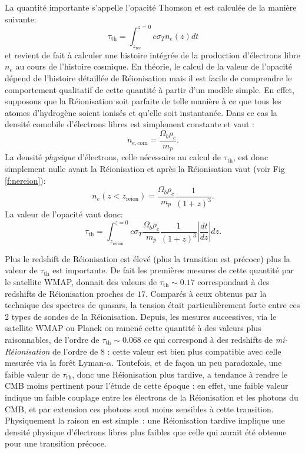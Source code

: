 La quantité importante s'appelle l'opacité Thomson et est calculée de la manière suivante:
\begin{equation}
\tau_\mathrm{th}=\int_{z_\mathrm{rec}}^{z=0} c \sigma_T n_e(z) dt
\end{equation}
et revient de fait à calculer une histoire intégrée de la production d'électrons libre $n_e$ au cours de l'histoire cosmique. En théorie, le calcul de la valeur de l'opacité dépend de l'histoire détaillée de Réionisation mais il est facile de comprendre le comportement qualitatif de cette quantité à partir d'un modèle simple. En effet, supposons que la Réionisation soit parfaite de telle manière à ce que tous les atomes d'hydrogène soient ionisés et qu'elle soit instantanée. Dans ce cas la densité comobile d'électrons libres est simplement constante et vaut :
\begin{equation}
n_\mathrm{e,com}=\frac{\Omega_b \rho_c}{m_p}.
\end{equation}
La densité \textit{physique} d'électrons, celle nécessaire au calcul de $\tau_\mathrm{th}$, est donc simplement nulle avant la Réionisation et après la Réionisation vaut (voir Fig \ref{f:nereion}):
\begin{equation}
n_e(z<z_\mathrm{reion})=\frac{\Omega_b \rho_c}{m_p} \frac{1}{(1+z)^3}.
\end{equation}
La valeur de l'opacité vaut donc:
\begin{equation}
\tau_\mathrm{th}=\int_{z_\mathrm{rerion}}^{z=0} c \sigma_T\frac{\Omega_b \rho_c}{m_p} \frac{1}{(1+z)^3}  |\frac{dt}{dz}| dz.
\end{equation}

Plus le redshift de Réionisation est élevé (plus la transition est précoce) plus la valeur de $\tau_\mathrm{th}$ est importante. De fait les premières mesures de cette quantité par le satellite WMAP, donnait des valeurs de $\tau_\mathrm{th}\sim 0.17$ correspondant à des redshifts de Réionisation proches de $17$. Comparés à ceux obtenus par la technique des spectres de quasars, la tension était particulièrement forte entre ces 2 types de sondes de la Réionisation. Depuis, les mesures successives, via le satellite WMAP ou Planck on ramené cette quantité à des valeurs plus raisonnables, de l'ordre de $\tau_\mathrm{th}\sim 0.068$ ce qui correspond à des redshifts de \textit{mi-Réionisation} de l'ordre de 8 : cette valeur est bien plus compatible avec celle mesurée via la forêt Lyman-$\alpha$. Toutefois, et de façon un peu paradoxale, une faible valeur de $\tau_\mathrm{th}$, donc une Réionisation plus tardive, a tendance à rendre le CMB moins pertinent pour l'étude de cette époque : en effet, une faible valeur indique un faible couplage entre les électrons de la Réionisation et les photons du CMB, et par extension ces photons sont moins sensibles à cette transition. Physiquement la raison en est simple~: une Réionisation tardive implique une densité physique d'électrons libres plus faibles que celle qui aurait été obtenue pour une transition précoce.

